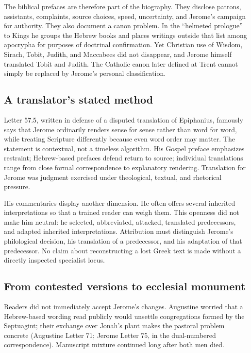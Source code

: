 The biblical prefaces are therefore part of the biography. They disclose
patrons, assistants, complaints, source choices, speed, uncertainty, and
Jerome's campaign for authority. They also document a canon problem. In the
``helmeted prologue'' to Kings he groups the Hebrew books and places writings
outside that list among apocrypha for purposes of doctrinal confirmation. Yet
Christian use of Wisdom, Sirach, Tobit, Judith, and Maccabees did not disappear,
and Jerome himself translated Tobit and Judith. The Catholic canon later
defined at Trent cannot simply be replaced by Jerome's personal classification.

\subsection{A translator's stated method}

Letter 57.5, written in defense of a disputed translation of Epiphanius,
famously says that Jerome ordinarily renders sense for sense rather than word
for word, while treating Scripture differently because even word order may
matter. The statement is contextual, not a timeless algorithm. His Gospel
preface emphasizes restraint; Hebrew-based prefaces defend return to source;
individual translations range from close formal correspondence to explanatory
rendering. Translation for Jerome was judgment exercised under theological,
textual, and rhetorical pressure.

His commentaries display another dimension. He often offers several inherited
interpretations so that a trained reader can weigh them. This openness did not
make him neutral: he selected, abbreviated, attacked, translated predecessors,
and adapted inherited interpretations. Attribution must distinguish Jerome's
philological decision, his translation of a predecessor, and his adaptation of
that predecessor. No claim about reconstructing a lost Greek text is made
without a directly inspected specialist locus.

\subsection{From contested versions to ecclesial monument}

Readers did not immediately accept Jerome's changes. Augustine worried that a
Hebrew-based wording read publicly would unsettle congregations formed by the
Septuagint; their exchange over Jonah's plant makes the pastoral problem
concrete (Augustine Letter 71; Jerome Letter 75, in the dual-numbered
correspondence). Manuscript mixture continued long after both men died.

